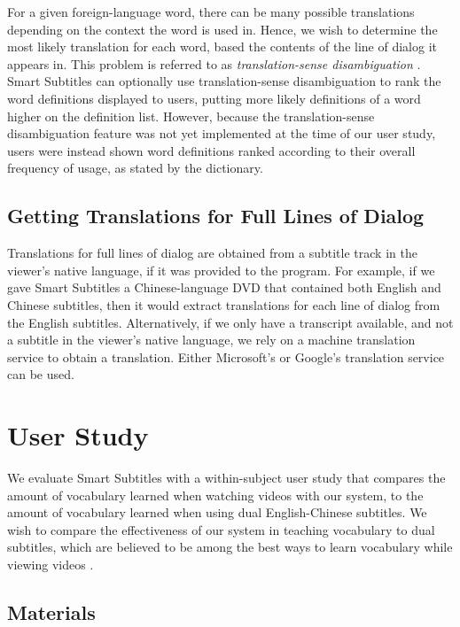 \documentclass{sigchi}
\begin{document}
For a given foreign-language
word, there can be many possible translations depending on
the context the word is used in.
Hence, we wish to determine the most likely translation for each word,
based the contents of the line of dialog it appears in.
This problem is referred to as \emph{translation-sense disambiguation}
\cite{translationsense}.
Smart Subtitles can optionally use translation-sense disambiguation
to rank the word definitions displayed to users, putting
more likely definitions of a word higher on the definition list.
However, because the translation-sense disambiguation feature was not yet implemented at the time of our user study, users were instead shown word definitions ranked according to their overall frequency of usage,
as stated by the dictionary.

\pagebreak

\subsection{Getting Translations for Full Lines of Dialog}

Translations for full lines of dialog are obtained from a subtitle track in the viewer's native language, if it was provided to 
the program. For example, if we gave Smart Subtitles a Chinese-language DVD
that contained both English and Chinese subtitles, then it would
extract translations for each line of dialog from the English subtitles.
Alternatively, if we only have a transcript available, and not a subtitle in the viewer's native language, we rely on a machine translation service to obtain a translation. Either Microsoft's or Google's translation service can be used.

\section{User Study}

We evaluate Smart Subtitles with a within-subject user study that compares the amount of vocabulary learned when watching videos with our system, to the amount of vocabulary learned when using dual English-Chinese subtitles. We wish to compare the effectiveness of our system in teaching vocabulary to dual subtitles, which are believed to be among the best ways to learn vocabulary while viewing videos \cite{raine2012incidental}.

\subsection{Materials}
\end{document}
